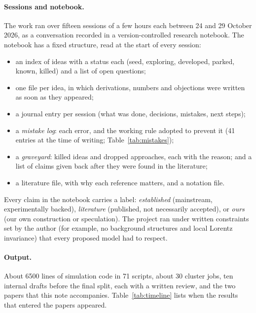 \documentclass[11pt,a4paper]{article}
\begin{document}
\paragraph{Sessions and notebook.} The work ran over fifteen sessions of a few hours each between 24 and 29 October 2026, as a conversation recorded in a version-controlled research notebook. The notebook has a fixed structure, read at the start of every session:
\begin{itemize}[itemsep=1pt]
\item an index of ideas with a status each (seed, exploring, developed, parked, known, killed) and a list of open questions;
\item one file per idea, in which derivations, numbers and objections were written as soon as they appeared;
\item a journal entry per session (what was done, decisions, mistakes, next steps);
\item a \emph{mistake log}: each error, and the working rule adopted to prevent it (41 entries at the time of writing; Table~\ref{tab:mistakes});
\item a \emph{graveyard}: killed ideas and dropped approaches, each with the reason; and a list of claims given back after they were found in the literature;
\item a literature file, with why each reference matters, and a notation file.
\end{itemize}
Every claim in the notebook carries a label: \emph{established} (mainstream, experimentally backed), \emph{literature} (published, not necessarily accepted), or \emph{ours} (our own construction or speculation). The project ran under written constraints set by the author (for example, no background structures and local Lorentz invariance) that every proposed model had to respect.

\paragraph{Output.} About 6500 lines of simulation code in 71 scripts, about 30 cluster jobs, ten internal drafts before the final split, each with a written review, and the two papers that this note accompanies. Table~\ref{tab:timeline} lists when the results that entered the papers appeared.
\end{document}
